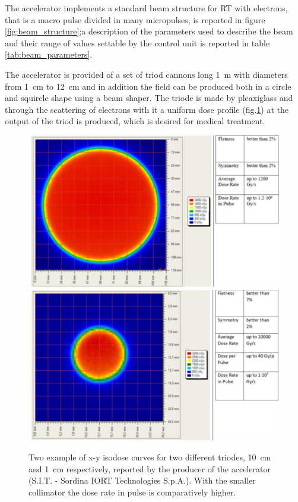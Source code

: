       The accelerator implements a standard beam structure for RT with electrons, that is a macro pulse divided in many micropulses, is reported in figure \ref{fig:beam_structure};a description of the parameters used to describe the beam and their range of values settable by the control unit is reported in table \ref{tab:beam_parameters}. 
  
      The accelerator is provided of a set of triod cannons long \SI{1}{m} with diameters from \SI{1}{cm} to \SI{12}{cm} and in addition the field can be produced both in a circle and squircle shape using a beam shaper. 
      The triode is made by pleaxiglass and through the scattering of electrons with it a uniform dose profile (fig.\ref{fig:dose_profile}) at the output of the triod is produced, which is desired for medical treatment.
      \begin{figure}[h!]
         \centering
         \includegraphics[width=.49\linewidth]{figures/test_beam/dose_profile_10cm.pdf}
         \includegraphics[width=.49\linewidth]{figures/test_beam/dose_profile_1cm.pdf}
         \caption{Two example of x-y isodose curves for two different triodes, \SI{10}{cm} and \SI{1}{cm} respectively, reported by the producer of the accelerator (S.I.T. - Sordina IORT Technologies S.p.A.). With the smaller collimator the dose rate in pulse is comparatively higher.}
         \label{fig:dose_profile}
      \end{figure}  

